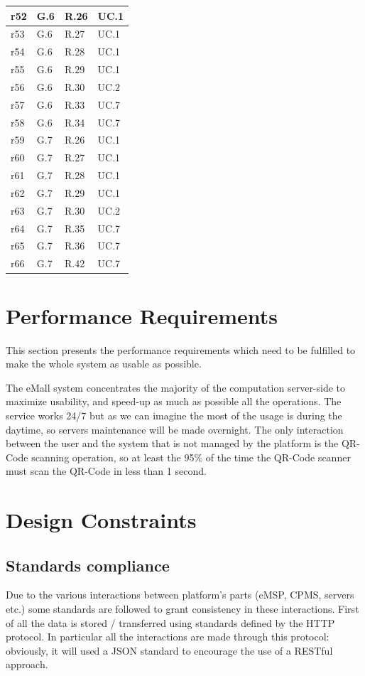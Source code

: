 \begin{longtable}{|l|l|l|l|}
r52    & G.6     & R.26   &         UC.1    \\ \hline
r53    & G.6     & R.27   &         UC.1    \\ \hline
r54    & G.6     & R.28   &         UC.1    \\ \hline
r55    & G.6     & R.29   &         UC.1    \\ \hline
r56    & G.6     & R.30   &         UC.2    \\ \hline
r57    & G.6     & R.33   &         UC.7    \\ \hline
r58    & G.6     & R.34   &         UC.7    \\ \hline

r59    & G.7     & R.26   &         UC.1    \\ \hline
r60    & G.7     & R.27   &         UC.1    \\ \hline
r61    & G.7     & R.28   &         UC.1    \\ \hline
r62    & G.7     & R.29   &         UC.1    \\ \hline
r63    & G.7     & R.30   &         UC.2    \\ \hline
r64    & G.7     & R.35   &         UC.7    \\ \hline
r65    & G.7     & R.36   &         UC.7    \\ \hline
r66    & G.7     & R.42   &         UC.7    \\ \hline
\end{longtable}
\section{Performance Requirements}
This section presents the performance requirements which need to be fulfilled to make the whole system as usable as possible.

 The eMall system concentrates the majority of the computation server-side to maximize usability, and speed-up as much as possible all the operations.
  The service works 24/7 but as we can imagine the most of the usage is during the daytime, so servers maintenance will be made overnight. The only interaction between the user and the system that is not managed by the platform is the QR-Code scanning operation, so at least the 95\% of the time the QR-Code scanner must scan the QR-Code in less than 1 second.
\section{Design Constraints}
\subsection{Standards compliance}
Due to the various interactions between platform's parts (eMSP, CPMS, servers etc.) some standards are followed to grant consistency in these interactions. First of all the data is stored / transferred using standards defined by the HTTP protocol. In particular all the interactions are made through this protocol: obviously, it will used a JSON standard to encourage the use of a RESTful approach.
